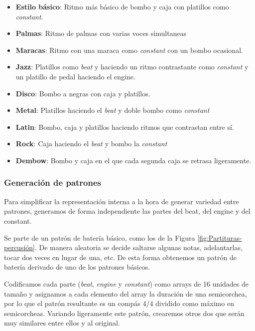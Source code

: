     \begin{itemize}
        \item \textbf{Estilo básico}: Ritmo más básico de bombo y caja con platillos como \textit{constant}.
        \item \textbf{Palmas}: Ritmo de palmas con varias voces simultaneas
        \item \textbf{Maracas}: Ritmo con una maraca como \textit{constant} con un bombo ocasional.
        \item \textbf{Jazz}: Platillos como \textit{beat} y haciendo un ritmo contrastante como \textit{constant} y un platillo de pedal haciendo el engine.
        \item \textbf{Disco}: Bombo a negras con caja y platillos.
        \item \textbf{Metal}: Platillos haciendo el \textit{beat} y doble bombo como \textit{constant}
        \item \textbf{Latin}: Bombo, caja y platillos haciendo ritmos que contrastan entre sí.
        \item \textbf{Rock}: Caja haciendo el \textit{beat} y bombo la \textit{constant}
        \item \textbf{Dembow}: Bombo y caja en el que cada segunda caja se retrasa ligeramente.
    \end{itemize}
    

    
    \subsubsection{Generación de patrones}
    \label{subsubsec:generacion-patrones}
    Para simplificar la representación interna a la hora de generar variedad entre patrones, generamos de forma independiente las partes del beat, del engine y del constant.
    
    Se parte de un patrón de batería básico, como los de la Figura \ref{fig:Partituras-percusión}. De manera aleatoria se decide saltarse algunas notas, adelantarlas, tocar dos veces en lugar de una, etc. De esta forma obtenemos un patrón de batería derivado de uno de los patrones básicos.

    Codificamos cada parte (\textit{beat}, \textit{engine} y \textit{constant}) como arrays de 16 unidades de tamaño y asignamos a cada elemento del array la duración de una semicorchea, por lo que el patrón resultante es un compás 4/4 dividido como máximo en semicorcheas. Variando ligeramente este patrón, crearemos otros dos que serán muy similares entre ellos y al original.

